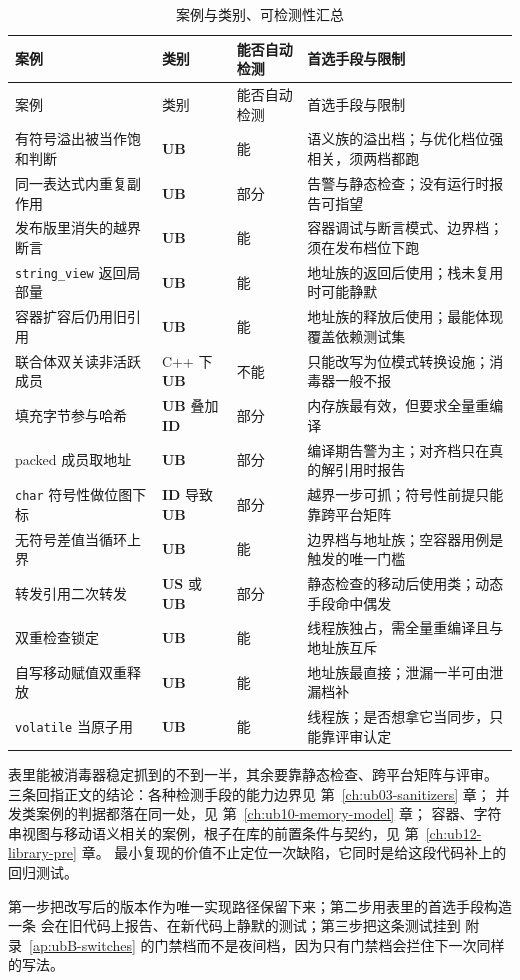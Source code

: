 \documentclass[12pt,a4paper,fontset=fandol]{ctexbook}
\newcommand{\Tp}[1]{\texttt{#1}}
\newcommand{\Bk}{\discretionary{}{}{}}
\newcommand{\Lang}[1]{\textsf{#1}}
\newcommand{\CPP}{\Lang{C++}}
\newcommand{\UB}{\textbf{\textsf{UB}}}
\newcommand{\IDB}{\textbf{\textsf{ID}}}
\newcommand{\USB}{\textbf{\textsf{US}}}
\begin{document}
\begin{longtable}{@{}>{\raggedright\arraybackslash}p{} >{\raggedright\arraybackslash}p{} >{\raggedright\arraybackslash}p{} >{\raggedright\arraybackslash}p{}@{}}
\caption{案例与类别、可检测性汇总}\label{tab:apC-summary}\\
\toprule
案例 & 类别 & 能否自动检测 & 首选手段与限制 \\
\midrule
\endfirsthead
\toprule
案例 & 类别 & 能否自动检测 & 首选手段与限制 \\
\midrule
\endhead
\bottomrule
\endfoot
有符号溢出被当作饱和判断 & \UB{} & 能 & 语义族的溢出档；与优化档位强相关，须两档都跑 \\
同一表达式内重复副作用 & \UB{} & 部分 & 告警与静态检查；没有运行时报告可指望 \\
发布版里消失的越界断言 & \UB{} & 能 & 容器调试与断言模式、边界档；须在发布档位下跑 \\
\Tp{string{\Bk}\_view} 返回局部量 & \UB{} & 能 & 地址族的返回后使用；栈未复用时可能静默 \\
容器扩容后仍用旧引用 & \UB{} & 能 & 地址族的释放后使用；最能体现覆盖依赖测试集 \\
联合体双关读非活跃成员 & \CPP{} 下 \UB{} & 不能 & 只能改写为位模式转换设施；消毒器一般不报 \\
填充字节参与哈希 & \UB{} 叠加 \IDB{} & 部分 & 内存族最有效，但要求全量重编译 \\
packed 成员取地址 & \UB{} & 部分 & 编译期告警为主；对齐档只在真的解引用时报告 \\
\Tp{char} 符号性做位图下标 & \IDB{} 导致 \UB{} & 部分 & 越界一步可抓；符号性前提只能靠跨平台矩阵 \\
无符号差值当循环上界 & \UB{} & 能 & 边界档与地址族；空容器用例是触发的唯一门槛 \\
转发引用二次转发 & \USB{} 或 \UB{} & 部分 & 静态检查的移动后使用类；动态手段命中偶发 \\
双重检查锁定 & \UB{} & 能 & 线程族独占，需全量重编译且与地址族互斥 \\
自写移动赋值双重释放 & \UB{} & 能 & 地址族最直接；泄漏一半可由泄漏档补 \\
\Tp{volatile} 当原子用 & \UB{} & 能 & 线程族；是否想拿它当同步，只能靠评审认定 \\
\end{longtable}

\begin{note}[title=从案例回到手段与契约]
表里能被消毒器稳定抓到的不到一半，其余要靠静态检查、跨平台矩阵与评审。
三条回指正文的结论：各种检测手段的能力边界见 第~\ref{ch:ub03-sanitizers} 章；
并发类案例的判据都落在同一处，见 第~\ref{ch:ub10-memory-model} 章；
容器、字符串视图与移动语义相关的案例，根子在库的前置条件与契约，见 第~\ref{ch:ub12-library-pre} 章。
最小复现的价值不止定位一次缺陷，它同时是给这段代码补上的回归测试。
\end{note}

\begin{bestpractice}[title=案例进代码库的三步]
第一步把改写后的版本作为唯一实现路径保留下来；第二步用表里的首选手段构造一条
会在旧代码上报告、在新代码上静默的测试；第三步把这条测试挂到 附录~\ref{ap:ubB-switches}
的门禁档而不是夜间档，因为只有门禁档会拦住下一次同样的写法。
\end{bestpractice}


\cleardoublepage
\end{document}
